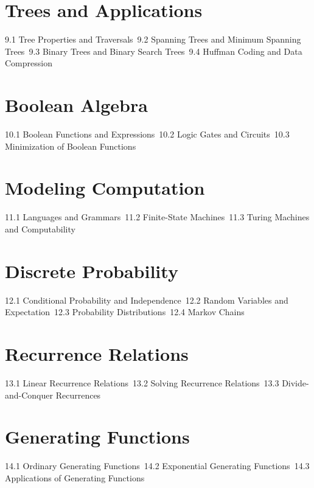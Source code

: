 \section{Trees and Applications}
9.1 Tree Properties and Traversals\
9.2 Spanning Trees and Minimum Spanning Trees\
9.3 Binary Trees and Binary Search Trees\
9.4 Huffman Coding and Data Compression\
\section{Boolean Algebra}
10.1 Boolean Functions and Expressions\
10.2 Logic Gates and Circuits\
10.3 Minimization of Boolean Functions\
\section{Modeling Computation}
11.1 Languages and Grammars\
11.2 Finite-State Machines\
11.3 Turing Machines and Computability\
\section{Discrete Probability}
12.1 Conditional Probability and Independence\
12.2 Random Variables and Expectation\
12.3 Probability Distributions\
12.4 Markov Chains\
\section{Recurrence Relations}
13.1 Linear Recurrence Relations\
13.2 Solving Recurrence Relations\
13.3 Divide-and-Conquer Recurrences\
\section{Generating Functions}
14.1 Ordinary Generating Functions\
14.2 Exponential Generating Functions\
14.3 Applications of Generating Functions\
